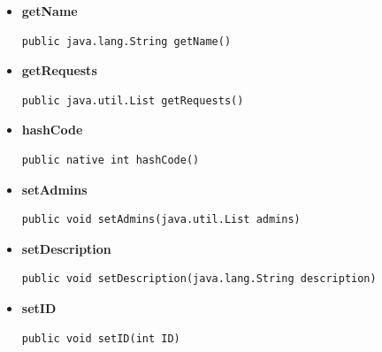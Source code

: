 \documentclass[11pt,a4paper]{report}
\begin{document}
{{{{{\begin{itemize}
{\begin{lstlisting}[frame=none]
public java.util.List getMembers()\end{lstlisting} %
}%
\item{ 
\hypertarget{edu.kit.pse17.go_app.PersistenceLayer.GroupEntity.getName()}{{\bf  getName}\\}
\begin{lstlisting}[frame=none]
public java.lang.String getName()\end{lstlisting} %
}%
\item{ 
\hypertarget{edu.kit.pse17.go_app.PersistenceLayer.GroupEntity.getRequests()}{{\bf  getRequests}\\}
\begin{lstlisting}[frame=none]
public java.util.List getRequests()\end{lstlisting} %
}%
\item{ 
\hypertarget{edu.kit.pse17.go_app.PersistenceLayer.GroupEntity.hashCode()}{{\bf  hashCode}\\}
\begin{lstlisting}[frame=none]
public native int hashCode()\end{lstlisting} %
}%
\item{ 
\hypertarget{edu.kit.pse17.go_app.PersistenceLayer.GroupEntity.setAdmins(java.util.List)}{{\bf  setAdmins}\\}
\begin{lstlisting}[frame=none]
public void setAdmins(java.util.List admins)\end{lstlisting} %
}%
\item{ 
\hypertarget{edu.kit.pse17.go_app.PersistenceLayer.GroupEntity.setDescription(java.lang.String)}{{\bf  setDescription}\\}
\begin{lstlisting}[frame=none]
public void setDescription(java.lang.String description)\end{lstlisting} %
}%
\item{ 
\hypertarget{edu.kit.pse17.go_app.PersistenceLayer.GroupEntity.setID(int)}{{\bf  setID}\\}
\begin{lstlisting}[frame=none]
public void setID(int ID)\end{lstlisting} %
}%

\end{itemize}}}}}}
\end{document}

